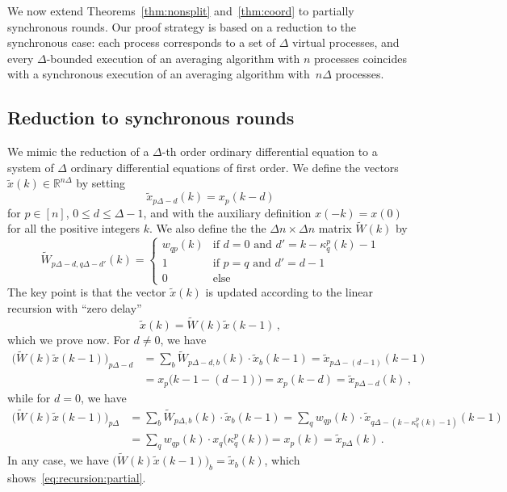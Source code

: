\documentclass[a4paper]{article}
\theoremstyle{newthm}
\newcommand{\IR}{\mathds{R}}
\renewcommand{\leq}{\leqslant}
\begin{document}
We now extend Theorems~\ref{thm:nonsplit} and~\ref{thm:coord} to
	partially synchronous rounds.
Our proof strategy is based on a reduction to the synchronous case:
	each process corresponds to a set of $\Delta$ virtual processes, and 
	every  $\Delta$-bounded execution of an averaging algorithm 
	with $n$ processes coincides with a synchronous execution
	of an averaging algorithm with~$n\Delta$ processes.

\subsection{Reduction to synchronous rounds}\label{sec:red}

We mimic the  reduction of a $\Delta$-th order ordinary differential
	equation to a system of $\Delta$ ordinary differential equations of first order.	
We define the vectors $\tilde{x}(k)\in\IR^{n\Delta}$ by setting
	\begin{equation}
	\tilde{x}_{p\Delta-d}(k) = x_p(k-d)
	\end{equation}
	for $p\in[n]$,  $0\leq d \leq \Delta-1$, and with the auxiliary definition $x(-k) = x(0)$ for all
	the positive integers $k$.
We also define the  the $\Delta n \times \Delta n$ matrix  
	$\tilde{W}(k) $ by
	\begin{equation}\label{eq:tildeW}
	\tilde{W}_{p\Delta-d,q\Delta-d'} (k)
	=
		\begin{cases}
		w_{qp}(k) & \text{if $d=0$ and $d' = k - \kappa_{q}^{p}(k) -1 $}\\
		1 & \text{if $p=q$ and $d' = d - 1$}\\
		0 & \text{else}
		\end{cases}
	\end{equation}	
The key point is  that  the vector $ \tilde{x}(k)$ is updated according to the linear
	recursion with ``zero delay'' 
	\begin{equation}\label{eq:recursion:partial}
	\tilde{x}(k) = \tilde{W}(k) \tilde{x}(k-1)\, ,
	\end{equation}
	 which we prove now.
For $d\neq 0$, we have
\begin{equation*}
\begin{split}
\big(\tilde{W}(k)\tilde{x}(k-1)\big)_{p\Delta - d} & =
\sum_ b \tilde{W}_{p\Delta - d, b} (k) \cdot \tilde{x}_{ b}(k-1)
=
\tilde{x}_{p\Delta - (d -1)}(k-1)
\\ & =
x_p\big(k - 1 - (d -1)\big) = x_p(k-d)
=
\tilde{x}_{p\Delta - d}(k) \, ,
\end{split}
\end{equation*}
while
for $d = 0$, we have
\begin{equation*}
\begin{split}
\big(\tilde{W}(k)\tilde{x}(k-1)\big)_{p\Delta}
& =
\sum_ b \tilde{W}_{p\Delta, b} (k) \cdot \tilde{x}_{ b}(k-1)
=
\sum_q w_{qp}(k) \cdot \tilde{x}_{q\Delta - (k - \kappa_q^p(k) - 1)}(k-1)
\\ & =
\sum_q w_{qp}(k) \cdot x_q\big( \kappa_q^p(k)\big) 
=
x_p(k) 
=
\tilde{x}_{p\Delta}(k) \, .
\end{split}
\end{equation*}
In any case, we have $\big(\tilde{W}(k)\tilde{x}(k-1)\big)_{ b} = \tilde{x}_ b(k)$, 
	which shows~\eqref{eq:recursion:partial}.
\end{document}
